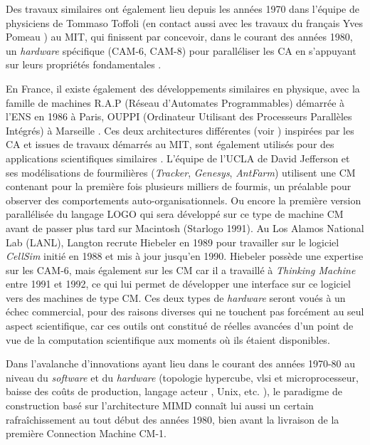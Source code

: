 Des travaux similaires ont également lieu depuis les années 1970 dans l’équipe de physiciens de Tommaso Toffoli (en contact aussi avec les travaux du français Yves Pomeau \autocites{Toffoli2005,Toffoli1987}) au MIT, qui finissent par concevoir, dans le courant des années 1980, un \textit{hardware} spécifique (CAM-6, CAM-8) pour paralléliser les CA en s’appuyant sur leurs propriétés fondamentales \autocite{Toffoli1987} .


En France, il existe également des développements similaires en physique, avec la famille de machines R.A.P (Réseau d’Automates Programmables) démarrée à l'ENS en 1986 à Paris, OUPPI (Ordinateur Utilisant des Processeurs Parallèles Intégrés) à Marseille \autocites{Manneville1989, Hiebeler1990}. Ces deux architectures différentes (voir \autocite{Hillis1981}) inspirées par les CA \autocites{Hillis1984, Hillis1989, Toffoli1987} et issues de travaux démarrés au MIT, sont également utilisés pour des applications scientifiques similaires \autocite{Toffoli2005}. L’équipe de l’UCLA de David Jefferson et ses modélisations de fourmilières (\textit{Tracker}, \textit{Genesys}, \textit{AntFarm}) utilisent une CM contenant pour la première fois plusieurs milliers de fourmis, un préalable pour observer des comportements auto-organisationnels. Ou encore la première version parallélisée du langage LOGO qui sera développé sur ce type de machine CM avant de passer plus tard sur Macintosh (Starlogo 1991). Au Los Alamos National Lab (LANL), Langton recrute Hiebeler en 1989 pour travailler sur le logiciel \textit{CellSim} initié en 1988 et mis à jour jusqu’en 1990. Hiebeler possède une expertise sur les CAM-6, mais également sur les CM car il a travaillé à \textit{Thinking Machine} entre 1991 et 1992, ce qui lui permet de développer une interface sur ce logiciel vers des machines de type CM. Ces deux types de \textit{hardware} seront voués à un échec commercial, pour des raisons diverses qui ne touchent pas forcément au seul aspect scientifique, car ces outils ont constitué de réelles avancées d’un point de vue de la computation scientifique aux moments où ils étaient disponibles.

Dans l'avalanche d'innovations ayant lieu dans le courant des années 1970-80 au niveau du \textit{software} et du \textit{hardware} (topologie hypercube, vlsi et microprocesseur, baisse des coûts de production, langage acteur \autocite{Hewitt1973}, Unix, etc. ), le paradigme de construction basé sur l'architecture MIMD  connaît lui aussi un certain rafraîchissement au tout début des années 1980, bien avant la livraison de la première Connection Machine CM-1.

